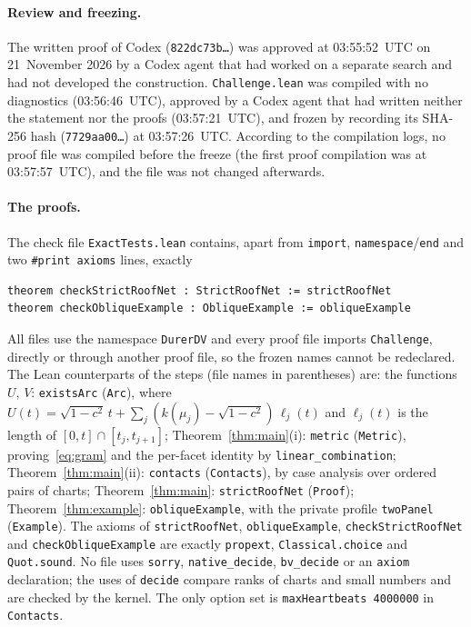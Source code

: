 \documentclass[11pt]{article}
\theoremstyle{definition}
\theoremstyle{remark}
\begin{document}
\paragraph{Review and freezing.} The written proof of Codex
(\texttt{822dc73b\ldots}) was approved at 03:55:52~UTC on 21~November 2026 by
a Codex agent that had worked on a separate search and had not developed the
construction. \texttt{Challenge.lean} was compiled with no diagnostics
(03:56:46~UTC), approved by a Codex agent that had written neither the
statement nor the proofs (03:57:21~UTC), and frozen by recording its SHA-256
hash (\texttt{7729aa00\ldots}) at 03:57:26~UTC. According to the compilation
logs, no proof file was compiled before the freeze (the first proof
compilation was at 03:57:57~UTC), and the file was not changed afterwards.

\paragraph{The proofs.} The check file \texttt{ExactTests.lean} contains,
apart from \texttt{import}, \texttt{namespace}/\texttt{end} and two
\texttt{\#print axioms} lines, exactly
{\footnotesize
\begin{verbatim}
theorem checkStrictRoofNet : StrictRoofNet := strictRoofNet
theorem checkObliqueExample : ObliqueExample := obliqueExample
\end{verbatim}}
\noindent All files use the namespace \texttt{DurerDV} and every proof file
imports \texttt{Challenge}, directly or through another proof file, so the frozen names cannot be redeclared. The
Lean counterparts of the steps (file names in parentheses) are:
the functions $U$, $V$: \texttt{existsArc} (\texttt{Arc}), where
$U(t)=\sqrt{1-c^2}\,t+\sum_j(k(\mu_j)-\sqrt{1-c^2})\,\ell_j(t)$ and
$\ell_j(t)$ is the length of $[0,t]\cap[t_j,t_{j+1}]$;
Theorem~\ref{thm:main}(i): \texttt{metric} (\texttt{Metric}), proving~\eqref{eq:gram}
and the per-facet identity by \texttt{linear\_combination};
Theorem~\ref{thm:main}(ii): \texttt{contacts} (\texttt{Contacts}), by case
analysis over ordered pairs of charts; Theorem~\ref{thm:main}: \texttt{strictRoofNet}
(\texttt{Proof}); Theorem~\ref{thm:example}: \texttt{obliqueExample}, with the
private profile \texttt{twoPanel} (\texttt{Example}). The axioms of
\texttt{strictRoofNet}, \texttt{obliqueExample}, \texttt{checkStrictRoofNet}
and \texttt{checkObliqueExample} are exactly \texttt{propext},
\texttt{Classical.choice} and \texttt{Quot.sound}. No file uses
\texttt{sorry}, \texttt{native\_\allowbreak decide},
\texttt{bv\_\allowbreak decide} or an \texttt{axiom} declaration; the uses of
\texttt{decide} compare ranks of charts and small numbers and are checked by
the kernel. The only option set is \texttt{maxHeartbeats 4000000} in
\texttt{Contacts}.
\end{document}
